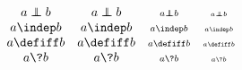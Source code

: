 \documentclass{unittest}
\begin{document}
\(\begin{array}{cccc}
\\\\%
\\	{\displaystyle a \INDEP b}	& {\textstyle a \INDEP b} & {\scriptstyle a \INDEP b}	& {\scriptscriptstyle a \INDEP b}
\\	{\displaystyle a \indep b}		&	 {\textstyle a \indep b}	& {\scriptstyle a \indep b}	& {\scriptscriptstyle a \indep b}
\\	{\displaystyle a \defiff b}	& {\textstyle a \defiff b} & {\scriptstyle a \defiff b}	& {\scriptscriptstyle a \defiff b}
\\	{\displaystyle a \? b}	& {\textstyle a \? b} & {\scriptstyle a \? b}	& {\scriptscriptstyle a \? b}
\\\\%
\end{array}\)
\end{document}
